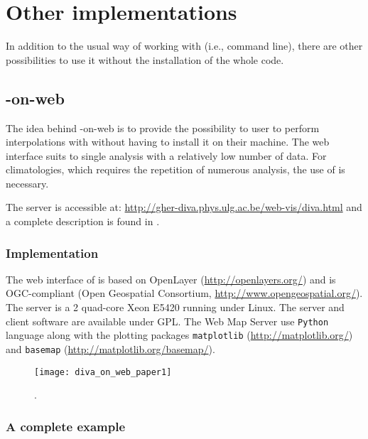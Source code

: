 \chapter{Other implementations\label{chap:divaonweb}}

In addition to the usual way of working with \diva (i.e., command line), there are other possibilities to use it without the installation of the whole code.
 
\minitoc

\newpage %

\section{\diva-on-web}

The idea behind \diva-on-web is to provide the possibility to user to perform interpolations with \diva without having to install it on their machine. The web interface suits to single analysis with a relatively low number of data. For climatologies, which requires the repetition of numerous analysis, the use of \diva is necessary.

The server is accessible at: \url{http://gher-diva.phys.ulg.ac.be/web-vis/diva.html} and a complete description is found in \citet{BARTH10}.


\subsection{Implementation}

The web interface of \diva is based on OpenLayer (\url{http://openlayers.org/}) and is OGC-compliant (Open Geospatial Consortium, \url{http://www.opengeospatial.org/}). The server is a 2 quad-core Xeon E5420 running under Linux. The server and client software are available under GPL. The Web Map Server use \texttt{Python} language along with the plotting packages \texttt{matplotlib} (\url{http://matplotlib.org/}) and \texttt{basemap} (\url{http://matplotlib.org/basemap/}). 

\begin{figure}[htpb]
	\centering
	\parbox{.5\textwidth}{
		\texttt{[image: diva\_on\_web\_paper1]}
		}\parbox{.5\textwidth}{
		\caption{.\label{fig:diva_on_web_paper1}}
		}
\end{figure}

\subsection{A complete example}

